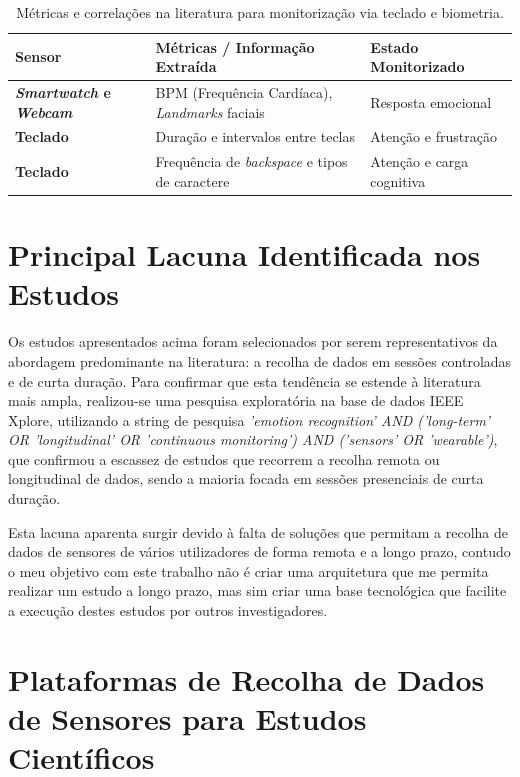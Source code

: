 \begin{table}[h]
    \centering
    \caption{Métricas e correlações na literatura para monitorização via teclado e biometria.}
    \label{tab:sensores_psico_fisiologico}
    \begin{tabular}{l|l|l}
        \toprule
        \textbf{Sensor} & \textbf{Métricas / Informação Extraída} & \textbf{Estado Monitorizado} \\ 
        \midrule
        \textbf{\textit{Smartwatch} e \textit{Webcam}} & \ac{BPM} (Frequência Cardíaca), \textit{Landmarks} faciais  & Resposta emocional~\cite{facial_hrv_study} \\
        \addlinespace
        \textbf{Teclado} & Duração e intervalos entre teclas & Atenção e frustração~\cite{keyboard_speed_study} \\
        \addlinespace
        \textbf{Teclado} & Frequência de \textit{backspace} e tipos de caractere & Atenção e carga cognitiva~\cite{keyboard_correction_study} \\
        \bottomrule
    \end{tabular}
\end{table}

\section{Principal Lacuna Identificada nos Estudos}

Os estudos apresentados acima foram selecionados por serem representativos da abordagem predominante na literatura: a recolha de dados em sessões controladas e de curta duração. Para confirmar que esta tendência se estende à literatura mais ampla, realizou-se uma pesquisa exploratória na base de dados IEEE Xplore, utilizando a string de pesquisa \textit{'emotion recognition' AND ('long-term' OR 'longitudinal' OR 'continuous monitoring') AND ('sensors' OR 'wearable')}, que confirmou a escassez de estudos que recorrem a recolha remota ou longitudinal de dados, sendo a maioria focada em sessões presenciais de curta duração.

Esta lacuna aparenta surgir devido à falta de soluções que permitam a recolha de dados de sensores de vários utilizadores de forma remota e a longo prazo, contudo o meu objetivo com este trabalho não é criar uma arquitetura que me permita realizar um estudo a longo prazo, mas sim criar uma base tecnológica que facilite a execução destes estudos por outros investigadores.

\section{Plataformas de Recolha de Dados de Sensores para Estudos Científicos}

